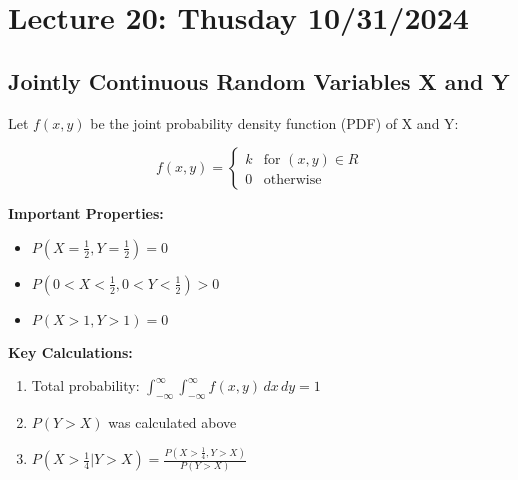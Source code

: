 \documentclass{article}
\begin{document}
        \pagebreak

        \section*{Lecture 20: Thusday 10/31/2024}

        \subsection*{Jointly Continuous Random Variables X and Y}

        Let $f(x,y)$ be the joint probability density function (PDF) of X and Y:

        \[
        f(x,y) = 
        \begin{cases}
            k & \text{for } (x,y) \in R \\
            0 & \text{otherwise}
        \end{cases}
        \]

        \textbf{Important Properties:}
        \begin{itemize}
            \item $P(X=\frac{1}{2}, Y=\frac{1}{2}) = 0$
            \item $P(0<X<\frac{1}{2}, 0<Y<\frac{1}{2}) > 0$
            \item $P(X>1, Y>1) = 0$
        \end{itemize}

        \textbf{Key Calculations:}
        \begin{enumerate}
            \item Total probability: $\int_{-\infty}^\infty \int_{-\infty}^\infty f(x,y) \, dx \, dy = 1$
            \item $P(Y > X)$ was calculated above
            \item $P(X>\frac{1}{4} | Y>X) = \frac{P(X>\frac{1}{4}, Y>X)}{P(Y>X)}$
        \end{enumerate}
\end{document}
